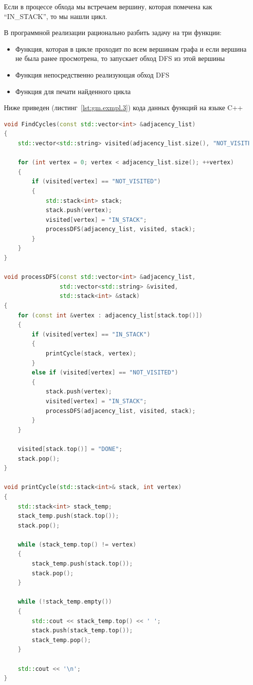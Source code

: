 Если в процессе обхода мы встречаем вершину, которая помечена как ``IN_STACK'', то мы нашли цикл.

В программной реализации рационально разбить задачу на три функции:
\begin{itemize}
	\item Функция, которая в цикле проходит по всем вершинам графа и если вершина не была ранее просмотрена, то запускает обход DFS из этой вершины
	\item Функция непосредственно реализующая обход DFS
	\item Функция для печати найденного цикла
\end{itemize}

Ниже приведен (листинг~\ref{lst:gm.exmpl.3}) кода данных функций на языке C++

\begin{lstlisting}[frame=single, label={lst:gm.exmpl.3}, caption={Решение задачи поиска циклов в ориентированном графе \textsf{G}}, language=C++]
void FindCycles(const std::vector<int> &adjacency_list)
{
    std::vector<std::string> visited(adjacency_list.size(), "NOT_VISITED");

    for (int vertex = 0; vertex < adjacency_list.size(); ++vertex)
    {
        if (visited[vertex] == "NOT_VISITED")
        {
            std::stack<int> stack;
            stack.push(vertex);
            visited[vertex] = "IN_STACK";
            processDFS(adjacency_list, visited, stack);
        }
    }
}

void processDFS(const std::vector<int> &adjacency_list,
                std::vector<std::string> &visited,
                std::stack<int> &stack)
{
    for (const int &vertex : adjacency_list[stack.top()])
    {
        if (visited[vertex] == "IN_STACK")
        {
            printCycle(stack, vertex);
        }
        else if (visited[vertex] == "NOT_VISITED")
        {
            stack.push(vertex);
            visited[vertex] = "IN_STACK";
            processDFS(adjacency_list, visited, stack);
        }
    }

    visited[stack.top()] = "DONE";
    stack.pop();
}

void printCycle(std::stack<int>& stack, int vertex)
{
    std::stack<int> stack_temp;
    stack_temp.push(stack.top());
    stack.pop();

    while (stack_temp.top() != vertex)
    {
        stack_temp.push(stack.top());
        stack.pop();
    }

    while (!stack_temp.empty())
    {
        std::cout << stack_temp.top() << ' ';
        stack.push(stack_temp.top());
        stack_temp.pop();
    }

    std::cout << '\n';
}
\end{lstlisting}


\noteattributes{}
